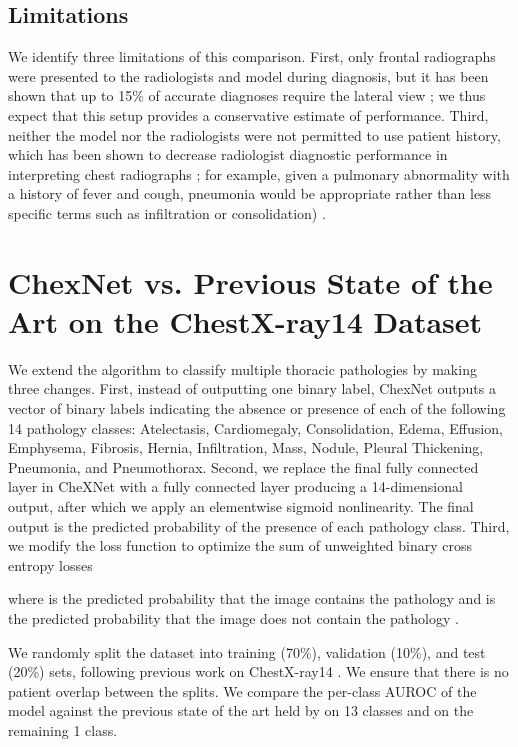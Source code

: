 \documentclass{article}
\begin{document}
\subsection{Limitations}
We identify three limitations of this comparison. First, only frontal radiographs were presented to the radiologists and model during diagnosis, but it has been shown that up to 15\% of accurate diagnoses require the lateral view \cite{raoof2012interpretation}; we thus expect that this setup provides a conservative estimate of performance. Third, neither the model nor the radiologists were not permitted to use patient history, which has been shown to decrease radiologist diagnostic performance in interpreting chest radiographs \cite{Berbaum1985,Potchen1979}; for example, given a pulmonary abnormality with a history of fever and cough, pneumonia would be appropriate rather than less specific terms such as infiltration or consolidation) \cite{Potchen1979}. 
 
\section{ChexNet vs. Previous State of the Art on the ChestX-ray14 Dataset}

We extend the algorithm to classify multiple thoracic pathologies by making three changes.
First, instead of outputting one binary label, ChexNet outputs a vector  of binary labels indicating the absence or presence of each of the following 14 pathology classes: Atelectasis, Cardiomegaly, Consolidation, Edema, Effusion, Emphysema, Fibrosis, Hernia, Infiltration, Mass, Nodule, Pleural Thickening, Pneumonia, and Pneumothorax. 
Second, we replace the final fully connected layer in CheXNet with a fully connected layer producing a 14-dimensional output, after which we apply an elementwise sigmoid nonlinearity. The final output is the predicted probability of the presence of each pathology class.  Third, we modify the loss function to optimize the sum of unweighted binary cross entropy losses



where  is the predicted probability that the image contains the pathology  and  is the predicted probability that the image does not contain the pathology .

We randomly split the dataset into training (70\%), validation (10\%), and test (20\%) sets, following previous work on ChestX-ray14 \citep{Wang2017,Yao2017}. We ensure that there is no patient overlap between the splits. We compare the per-class AUROC of the model against the previous state of the art held by \citet{Yao2017} on 13 classes and \citet{Wang2017} on the remaining 1 class.
\end{document}
